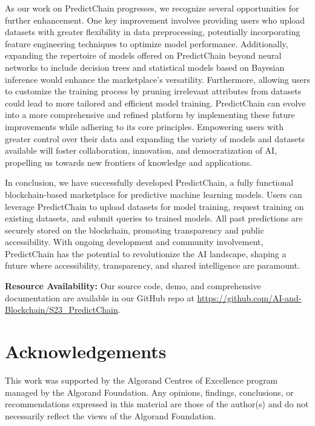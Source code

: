 \documentclass{ledger}
\begin{document}
As our work on PredictChain progresses, we recognize several opportunities for further enhancement. One key improvement involves providing users who upload datasets with greater flexibility in data preprocessing, potentially incorporating feature engineering techniques to optimize model performance. Additionally, expanding the repertoire of models offered on PredictChain beyond neural networks to include decision trees and statistical models based on Bayesian inference would enhance the marketplace's versatility. Furthermore, allowing users to customize the training process by pruning irrelevant attributes from datasets could lead to more tailored and efficient model training.
PredictChain can evolve into a more comprehensive and refined platform by implementing these future improvements while adhering to its core principles. Empowering users with greater control over their data and expanding the variety of models and datasets available will foster collaboration, innovation, and democratization of AI, propelling us towards new frontiers of knowledge and applications.

In conclusion, we have successfully developed PredictChain, a fully functional blockchain-based marketplace for predictive machine learning models. Users can leverage PredictChain to upload datasets for model training, request training on existing datasets, and submit queries to trained models. All past predictions are securely stored on the blockchain, promoting transparency and public accessibility.
With ongoing development and community involvement, PredictChain has the potential to revolutionize the AI landscape, shaping a future where accessibility, transparency, and shared intelligence are paramount.

\noindent\textbf{Resource Availability:} Our source code, demo, and comprehensive documentation are available in our GitHub repo at \url{https://github.com/AI-and-Blockchain/S23_PredictChain}.

\ledgernotes

\section*{Acknowledgements}
This work was supported by the Algorand Centres of Excellence program managed by the Algorand Foundation. Any opinions, findings, conclusions, or recommendations expressed in this material are those of the author(s) and do not necessarily reflect the views of the Algorand Foundation.


\end{document}
